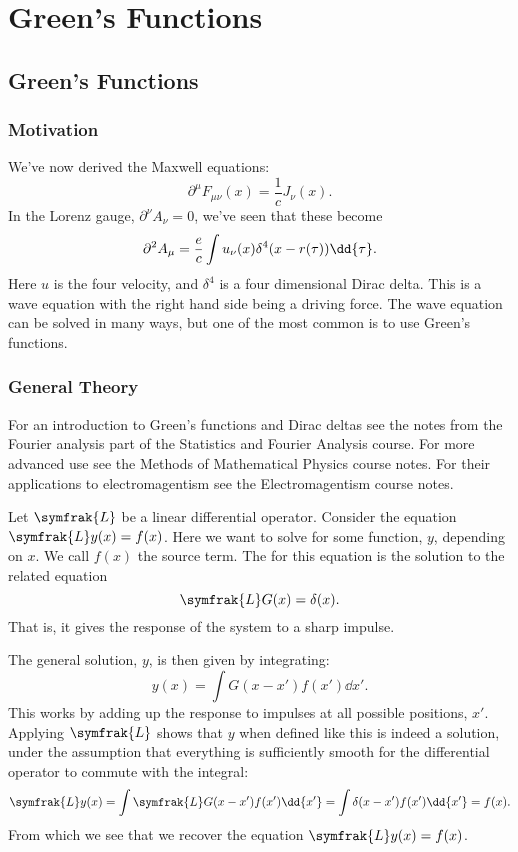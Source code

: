 \part{Green's Functions}
\chapter{Green's Functions}
\section{Motivation}
We've now derived the Maxwell equations:
\begin{equation}
    \partial^\mu F_{\mu\nu} (x) = \frac{1}{c}J_\nu(x).
\end{equation}
In the Lorenz gauge, \(\partial^\nu A_\nu = 0\), we've seen that these become
\begin{equation}
    \dalembertian A_\mu = \frac{e}{c} \int u_\nu(x) \delta^4(x - r(\tau)) \dd{\tau}.
\end{equation}
Here \(u\) is the four velocity, and \(\delta^4\) is a four dimensional Dirac delta.
This is a wave equation with the right hand side being a driving force.
The wave equation can be solved in many ways, but one of the most common is to use Green's functions.

\section{General Theory}
\begin{rmk}
    For an introduction to Green's functions and Dirac deltas see the notes from the Fourier analysis part of the Statistics and Fourier Analysis course.
    For more advanced use see the Methods of Mathematical Physics course notes.
    For their applications to electromagentism see the Electromagentism course notes.
\end{rmk}
Let \(\symfrak{L}\) be a linear differential operator.
Consider the equation \(\symfrak{L} y(x) = f(x)\).
Here we want to solve for some function, \(y\), depending on \(x\).
We call \(f(x)\) the source term.
The  for this equation is the solution to the related equation
\begin{equation}
    \symfrak{L} G(x) = \delta(x).
\end{equation}
That is, it gives the response of the system to a sharp impulse.

The general solution, \(y\), is then given by integrating:
\begin{equation}
    y(x) = \int G(x - x') f(x') \dd{x'}.
\end{equation}
This works by adding up the response to impulses at all possible positions, \(x'\).
Applying \(\symfrak{L}\) shows that \(y\) when defined like this is indeed a solution, under the assumption that everything is sufficiently smooth for the differential operator to commute with the integral:
\begin{equation}
    \symfrak{L} y(x) = \int \symfrak{L} G(x - x') f(x') \dd{x'} = \int \delta(x - x') f(x') \dd{x'} = f(x).
\end{equation}
From which we see that we recover the equation \(\symfrak{L}y(x) = f(x)\).

